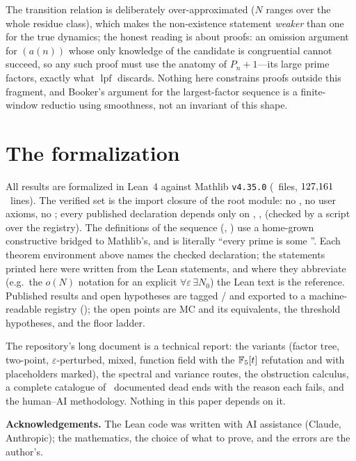 \documentclass[10pt,a4paper]{article}
\newcommand{\lpf}{\operatorname{lpf}}
\begin{document}
The transition relation is deliberately over-approximated ($N$ ranges over
the whole residue class), which makes the non-existence statement
\emph{weaker} than one for the true dynamics; the honest reading is about
proofs: an omission argument for $(a(n))$ whose only knowledge of the
candidate is congruential cannot succeed, so any such proof must use the
anatomy of $P_n+1$---its large prime factors, exactly what $\lpf$
discards.  Nothing here constrains proofs outside this fragment, and
Booker's argument for the largest-factor sequence is a finite-window
reductio using smoothness, not an invariant of this shape.

\section{The formalization}
\label{sec:lean}

All results are formalized in Lean~4 against Mathlib \texttt{v4.35.0}
(\EMFileCount~files, $127{,}161$~lines).  The verified set is the import
closure of the root module: no , no user axioms, no
; every published declaration depends only on
, ,  (checked by a
script over the registry).  The definitions of the sequence
(, ) use a home-grown constructive
 bridged to Mathlib's, and  is
literally ``every prime is some ''.  Each theorem environment
above names the checked declaration; the statements printed here were
written from the Lean statements, and where they abbreviate (e.g.\ the
$o(N)$ notation for an explicit $\forall\varepsilon\,\exists N_0$) the Lean
text is the reference.  Published results and open hypotheses are tagged
/ and exported to a machine-readable
registry (); the open points are MC and its equivalents,
the threshold hypotheses, and the floor ladder.

The repository's long document is a technical report: the variants
(factor tree, two-point, $\varepsilon$-perturbed, mixed, function field
with the $\mathbb{F}_5[t]$ refutation and with placeholders marked), the
spectral and variance routes, the
obstruction calculus, a complete catalogue of \DEentries~documented dead
ends with the reason each fails, and the human--AI methodology.  Nothing
in this paper depends on it.

\bigskip
\noindent\textbf{Acknowledgements.}  The Lean code was written with AI
assistance (Claude, Anthropic); the mathematics, the choice of what to
prove, and the errors are the author's.
\end{document}
